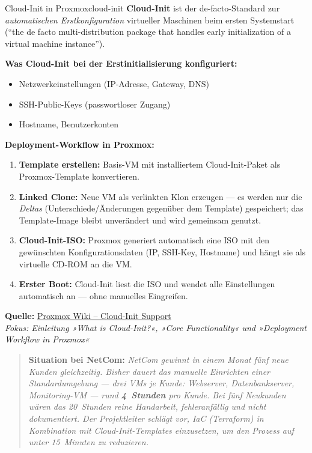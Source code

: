 \documentclass[a4paper,10pt,addpoints]{exam}
\begin{document}
\begin{infoBox}{Cloud-Init in Proxmox}{cloud-init}
  \textbf{Cloud-Init} ist der de-facto-Standard zur \emph{automatischen
  Erstkonfiguration} virtueller Maschinen beim ersten Systemstart
  (\enquote{the de facto multi-distribution package that handles early
  initialization of a virtual machine instance}).

  \medskip
  \textbf{Was Cloud-Init bei der Erstinitialisierung konfiguriert:}
  \begin{itemize}
    \item Netzwerkeinstellungen (IP-Adresse, Gateway, DNS)
    \item SSH-Public-Keys (passwortloser Zugang)
    \item Hostname, Benutzerkonten
  \end{itemize}

  \medskip
  \textbf{Deployment-Workflow in Proxmox:}
  \begin{enumerate}
    \item \textbf{Template erstellen:} Basis-VM mit installiertem Cloud-Init-Paket
      als Proxmox-Template konvertieren.
    \item \textbf{Linked Clone:} Neue VM als verlinkten Klon erzeugen --- es werden
      nur die \emph{Deltas} (Unterschiede/Änderungen gegenüber dem Template)
      gespeichert; das Template-Image bleibt unverändert und wird gemeinsam genutzt.
    \item \textbf{Cloud-Init-ISO:} Proxmox generiert automatisch eine ISO mit den
      gewünschten Konfigurationsdaten (IP, SSH-Key, Hostname) und hängt sie als
      virtuelle CD-ROM an die VM.
    \item \textbf{Erster Boot:} Cloud-Init liest die ISO und wendet alle
      Einstellungen automatisch an --- ohne manuelles Eingreifen.
  \end{enumerate}

  \medskip\small
  \textbf{Quelle:} \href{https://pve.proxmox.com/wiki/Cloud-Init_Support}{Proxmox Wiki -- Cloud-Init Support}\\
  \hspace*{0.4em}\textit{Fokus: Einleitung »What is Cloud-Init?«,
    »Core Functionality« und »Deployment Workflow in Proxmox«}
\end{infoBox}

\begin{quote}
  \textbf{Situation bei NetCom:}
  \itshape
  NetCom gewinnt in einem Monat fünf neue Kunden gleichzeitig.
  Bisher dauert das manuelle Einrichten einer Standardumgebung ---
  drei VMs je Kunde: Webserver, Datenbankserver, Monitoring-VM ---
  rund \textbf{4~Stunden} pro Kunde.
  Bei fünf Neukunden wären das 20~Stunden reine Handarbeit,
  fehleranfällig und nicht dokumentiert.
  Der Projektleiter schlägt vor, IaC (Terraform) in Kombination mit
  Cloud-Init-Templates einzusetzen, um den Prozess auf unter
  15~Minuten zu reduzieren.
\end{quote}
\end{document}
